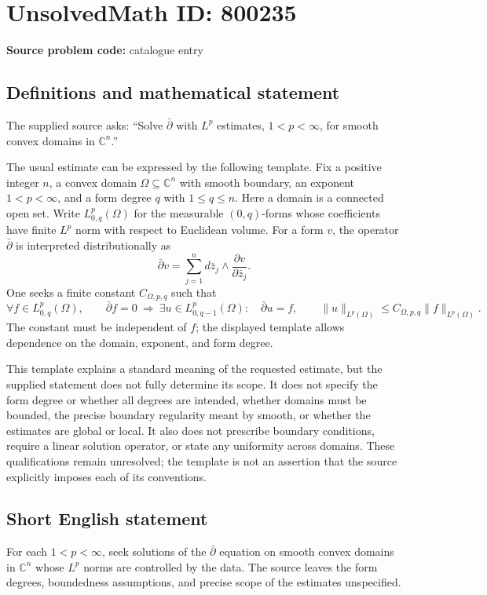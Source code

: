 \documentclass[11pt]{article}
\newcommand{\C}{\mathbb{C}}
\begin{document}
\section*{UnsolvedMath ID: 800235}
\textbf{Source problem code:} catalogue entry
\subsection{Definitions and mathematical statement}
The supplied source asks: ``Solve $\bar\partial$ with $L^p$ estimates, $1<p<\infty$, for smooth convex domains in $\C^n$.''

The usual estimate can be expressed by the following template. Fix a positive integer $n$, a convex domain $\Omega\subseteq\C^n$ with smooth boundary, an exponent $1<p<\infty$, and a form degree $q$ with $1\leq q\leq n$. Here a domain is a connected open set. Write $L^p_{0,q}(\Omega)$ for the measurable $(0,q)$-forms whose coefficients have finite $L^p$ norm with respect to Euclidean volume. For a form $v$, the operator $\bar\partial$ is interpreted distributionally as
\[
\bar\partial v=\sum_{j=1}^{n}d\bar z_j\wedge\frac{\partial v}{\partial\bar z_j}.
\]
One seeks a finite constant $C_{\Omega,p,q}$ such that
\[
\forall f\in L^p_{0,q}(\Omega),\qquad
\bar\partial f=0
\ \Longrightarrow\ 
\exists u\in L^p_{0,q-1}(\Omega):\quad
\bar\partial u=f,\qquad
\|u\|_{L^p(\Omega)}\leq C_{\Omega,p,q}\|f\|_{L^p(\Omega)}.
\]
The constant must be independent of $f$; the displayed template allows dependence on the domain, exponent, and form degree.

This template explains a standard meaning of the requested estimate, but the supplied statement does not fully determine its scope. It does not specify the form degree or whether all degrees are intended, whether domains must be bounded, the precise boundary regularity meant by smooth, or whether the estimates are global or local. It also does not prescribe boundary conditions, require a linear solution operator, or state any uniformity across domains. These qualifications remain unresolved; the template is not an assertion that the source explicitly imposes each of its conventions.
\subsection{Short English statement}
For each $1<p<\infty$, seek solutions of the $\bar\partial$ equation on smooth convex domains in $\C^n$ whose $L^p$ norms are controlled by the data. The source leaves the form degrees, boundedness assumptions, and precise scope of the estimates unspecified.
\end{document}
